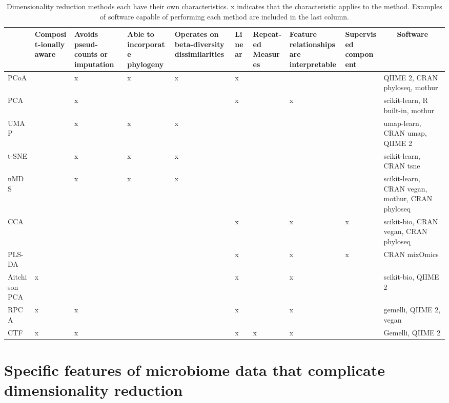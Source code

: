 \begin{table}
\caption{Dimensionality reduction methods each have their own characteristics. x indicates that the characteristic applies to the method. Examples of software capable of performing each method are included in the last column. }
\label{review_table2}
\centering
\begin{tabular}{p{1.8cm}p{1.6cm}p{1.6cm}p{2cm}p{2cm}p{1.3cm}p{1.3cm}p{1.6cm}p{1.5cm}p{3.2cm}}
\hline
 & Composit-ionally aware & Avoids pseud-counts or imputation & Able to incorporate phylogeny & Operates on beta-diversity   dissimilarities & Linear & Repeat-ed Measures & Feature relationships are   interpretable & Supervised component & \multicolumn{1}{c}{Software} \\ \hline\hline
PCoA &  & x & x & x & x &  &  &  & QIIME 2, CRAN phyloseq, mothur \\\hline
PCA &  & x &  &  & x &  & x &  & scikit-learn, R built-in, mothur \\\hline
UMAP &  & x & x & x &  &  &  &  & umap-learn, CRAN umap, QIIME 2 \\\hline
t-SNE &  & x & x & x &  &  &  &  & scikit-learn, CRAN tsne \\\hline
nMDS &  & x & x & x &  &  &  &  & scikit-learn, CRAN vegan, mothur,   CRAN phyloseq \\\hline
CCA &  &  &  &  & x &  & x & x & scikit-bio, CRAN vegan, CRAN   phyloseq \\\hline
PLS-DA &  &  &  &  & x &  & x & x & CRAN mixOmics \\\hline
Aitchison   PCA & x &  &  &  & x &  & x &  & scikit-bio, QIIME 2 \\\hline
RPCA & x & x &  &  & x &  & x &  & gemelli, QIIME 2, vegan \\\hline
CTF & x & x &  &  & x & x & x &  & Gemelli, QIIME 2 \\\hline
\end{tabular}
\end{table}

\section{Specific features of microbiome data that complicate dimensionality reduction}

